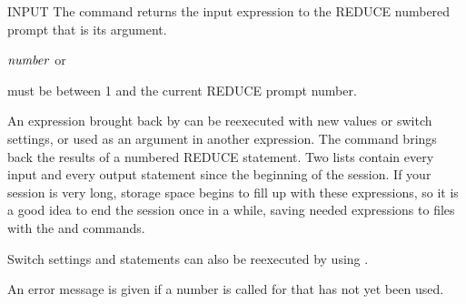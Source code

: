 \begin{Command}[input]{INPUT}
The  command returns the input expression to the REDUCE numbered
prompt that is its argument.
\begin{Syntax}
\(\meta{number}\) or  

\end{Syntax}

 must be between 1 and the current REDUCE prompt number.

\begin{Comments}
An expression brought back by  can be reexecuted with new
values or switch settings, or used as an argument in another expression.
The command  brings back the results of a numbered REDUCE
statement.  Two lists contain every input and every output statement since
the beginning of the session.  If your session is very long, storage space
begins to fill up with these expressions, so it is a good idea to end the
session once in a while, saving needed expressions to files with the
 and  commands.

Switch settings and  statements can also be reexecuted by using
.

An error message is given if a number is called for that has not yet been used.
\end{Comments}
\end{Command}


